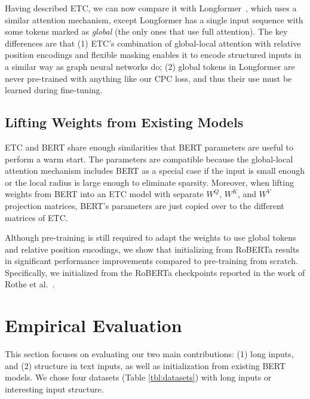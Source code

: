 \documentclass[11pt,a4paper]{article}
\begin{document}
Having described ETC, we can now compare it with Longformer~\cite{beltagy2020longformer}, which uses a similar attention mechanism, except Longformer has a single input sequence with some tokens marked as {\em global} (the only ones that use full attention). The key differences are that (1) ETC's combination of global-local attention with relative position encodings and flexible masking enables it to encode structured inputs in a similar way as graph neural networks do; (2) global tokens in Longformer are never pre-trained with anything like our CPC loss, and thus their use must be learned during fine-tuning. 



\subsection{Lifting Weights from Existing Models}

ETC and BERT share enough similarities that BERT parameters are useful to perform a warm start. The parameters are compatible because the global-local attention mechanism includes BERT as a special case if the input is small enough or the local radius is large enough to eliminate sparsity.
Moreover, when lifting weights from BERT into an ETC model with separate $W^Q$, $W^K$, and $W^V$ projection matrices, BERT's parameters are just copied over to the different matrices of ETC. 

Although pre-training is still required to adapt the weights to use global tokens and relative position encodings, we show that initializing from RoBERTa results in significant performance improvements compared to pre-training from scratch. Specifically, we initialized from the RoBERTa checkpoints reported in the work of Rothe et al.~\cite{rothe2020leveraging}.







\section{Empirical Evaluation}\label{sec:experiments}



This section focuses on evaluating our two main contributions: (1) long inputs, and (2) structure in text inputs, as well as initialization from existing BERT models. 
We chose four datasets (Table \ref{tbl:datasets}) with long inputs or interesting input structure.
\end{document}
